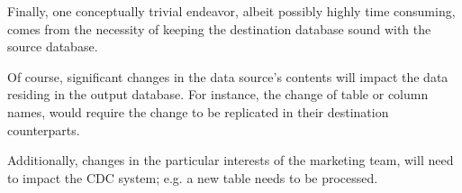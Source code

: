 Finally, one conceptually trivial endeavor, albeit possibly highly time consuming, comes from the necessity of keeping the destination database sound with the source database.

Of course, significant changes in the data source's contents will impact the data residing in the output database.
For instance, the change of table or column names, would require the change to be replicated in their destination counterparts.

Additionally, changes in the particular interests of the marketing team, will need to impact the CDC system; e.g. a new table needs to be processed.
